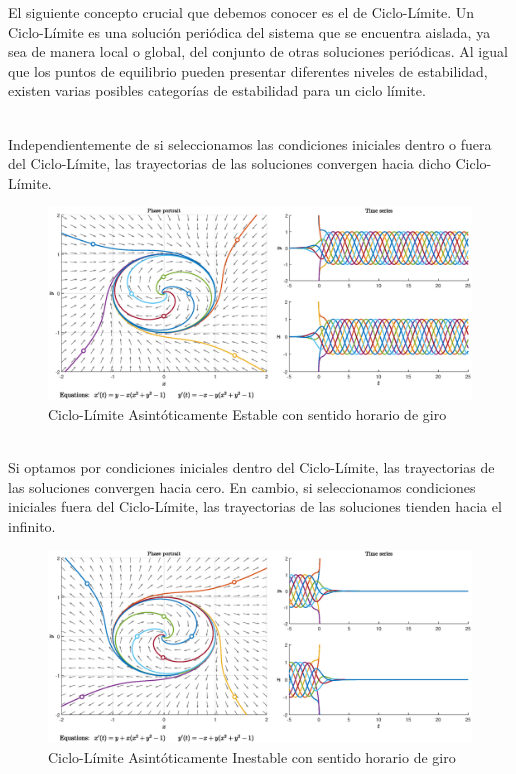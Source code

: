 \documentclass[12pt,a4paper]{report} %
\begin{document}
		\vspace{0.5cm}El siguiente concepto crucial que debemos conocer es el de Ciclo-Límite. Un Ciclo-Límite es una solución periódica del sistema que se encuentra aislada, ya sea de manera local o global, del conjunto de otras soluciones periódicas. Al igual que los puntos de equilibrio pueden presentar diferentes niveles de estabilidad, existen varias posibles categorías de estabilidad para un ciclo límite.\\[0.5cm]
		
		\newpage
		
		\\[0.5cm]
		
		Independientemente de si seleccionamos las condiciones iniciales dentro o fuera del Ciclo-Límite, las trayectorias de las soluciones convergen hacia dicho Ciclo-Límite.
		
		\begin{figure}[h]
			\centering
			\includegraphics[width=1\textwidth]{cle.eps}
			\caption{Ciclo-Límite Asintóticamente Estable con sentido horario de giro}
			\label{fig:cle}
		\end{figure}\smallskip
		
	\vspace{1cm}\\[0.5cm]
	
	Si optamos por condiciones iniciales dentro del Ciclo-Límite, las trayectorias de las soluciones convergen hacia cero. En cambio, si seleccionamos condiciones iniciales fuera del Ciclo-Límite, las trayectorias de las soluciones tienden hacia el infinito.
	
	\begin{figure}[h]
		\centering
		\includegraphics[width=1\textwidth]{cli.eps}
		\caption{Ciclo-Límite Asintóticamente Inestable con sentido horario de giro}
		\label{fig:cli}
	\end{figure}\smallskip
	
\end{document}
